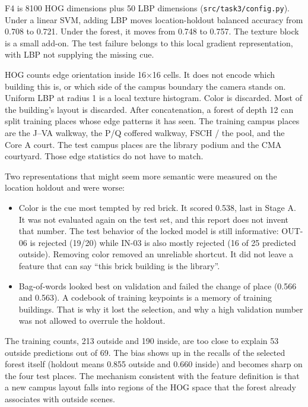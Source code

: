 \documentclass[11pt,a4paper]{article}
\providecommand{\tightlist}{%
  \setlength{\itemsep}{0pt}\setlength{\parskip}{0pt}}
\begin{document}
F4 is 8100 HOG dimensions plus 50 LBP dimensions (\texttt{src/\allowbreak{}task3/\allowbreak{}config.py}). Under a linear SVM, adding LBP moves location-holdout balanced accuracy from 0.708 to 0.721. Under the forest, it moves from 0.748 to 0.757. The texture block is a small add-on. The test failure belongs to this local gradient representation, with LBP not supplying the missing cue.

HOG counts edge orientation inside 16×16 cells. It does not encode which building this is, or which side of the campus boundary the camera stands on. Uniform LBP at radius 1 is a local texture histogram. Color is discarded. Most of the building's layout is discarded. After concatenation, a forest of depth 12 can split training places whose edge patterns it has seen. The training campus places are the J--VA walkway, the P/Q coffered walkway, FSCH / the pool, and the Core A court. The test campus places are the library podium and the CMA courtyard. Those edge statistics do not have to match.

Two representations that might seem more semantic were measured on the location holdout and were worse:

\begin{itemize}
\tightlist
\item
  Color is the cue most tempted by red brick. It scored 0.538, last in Stage A. It was not evaluated again on the test set, and this report does not invent that number. The test behavior of the locked model is still informative: OUT-06 is rejected (19/20) while IN-03 is also mostly rejected (16 of 25 predicted outside). Removing color removed an unreliable shortcut. It did not leave a feature that can say ``this brick building is the library''.
\item
  Bag-of-words looked best on validation and failed the change of place (0.566 and 0.563). A codebook of training keypoints is a memory of training buildings. That is why it lost the selection, and why a high validation number was not allowed to overrule the holdout.
\end{itemize}

The training counts, 213 outside and 190 inside, are too close to explain 53 outside predictions out of 69. The bias shows up in the recalls of the selected forest itself (holdout means 0.855 outside and 0.660 inside) and becomes sharp on the four test places. The mechanism consistent with the feature definition is that a new campus layout falls into regions of the HOG space that the forest already associates with outside scenes.
\end{document}
